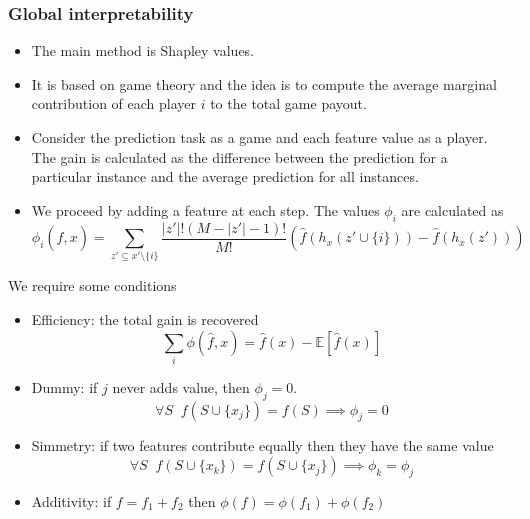 \documentclass{beamer}
\theoremstyle{plain}
\theoremstyle{definition}
\theoremstyle{remark}
\newcommand{\E}{\mathbb{E}}
\begin{document}
\begin{frame}
	\frametitle{Global interpretability}
	\begin{itemize}
		\item The main method is Shapley values.
		\item It is based on game theory and the idea is to compute the average marginal contribution of each player $i$ to the total game payout.
		\item Consider the prediction task as a game and each feature value as a player. The gain is calculated as the difference between the prediction for a particular instance and the average prediction for all instances.
		\item We proceed by adding a feature at each step. The values $\phi_i$ are calculated as
		\begin{equation*}
			\phi_i(\hat{f},x) = \sum_{z'\subseteq x'\setminus \{i\}}\frac{|z'|!(M-|z'|-1)!}{M!}(\hat{f}(h_x(z'\cup \{i\}))-\hat{f}(h_x(z')))
		\end{equation*}
	\end{itemize}
\end{frame}

\begin{frame}
	We require some conditions
	\begin{itemize}
		\item Efficiency: the total gain is recovered
		\begin{equation}
			\sum_{i}\phi(\hat{f},x) = \hat{f}(x) -\E[\hat{f}(x)]
		\end{equation}
		\item Dummy: if $j$ never adds value, then $\phi_j = 0$.
		\begin{equation}
			\forall S \;\; f(S\cup \{x_j\})=f(S) \implies \phi_j=0
		\end{equation}
		\item Simmetry: if two features contribute equally then they have the same value
		\begin{equation}
			\forall S\;\; f(S\cup \{x_k\})=f(S\cup \{x_j\})\implies \phi_k = \phi_j
		\end{equation}
		\item Additivity: if $f=f_1+f_2$ then $\phi(f)=\phi(f_1)+\phi(f_2)$
	\end{itemize}
\end{frame}
\end{document}
